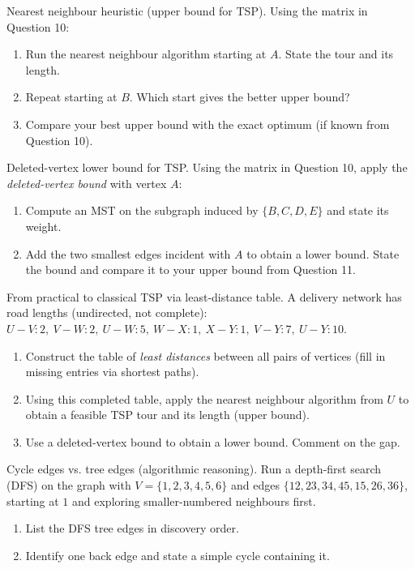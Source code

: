 \documentclass[11pt]{article}
\def\textbf#1{#1}%
\newcounter{question}
\begin{document}
\begin{question}
\textbf{Nearest neighbour heuristic (upper bound for TSP).}
Using the matrix in Question 10:
\begin{enumerate}
  \item Run the nearest neighbour algorithm starting at $A$. State the tour and its length.
  \item Repeat starting at $B$. Which start gives the better upper bound?
  \item Compare your best upper bound with the exact optimum (if known from Question 10).
\end{enumerate}
\end{question}

\begin{question}
\textbf{Deleted-vertex lower bound for TSP.}
Using the matrix in Question 10, apply the \emph{deleted-vertex bound} with vertex $A$:
\begin{enumerate}
  \item Compute an MST on the subgraph induced by $\{B,C,D,E\}$ and state its weight.
  \item Add the two smallest edges incident with $A$ to obtain a lower bound. State the bound and compare it to your upper bound from Question 11.
\end{enumerate}
\end{question}

\begin{question}
\textbf{From practical to classical TSP via least-distance table.}
A delivery network has road lengths (undirected, not complete): 
$U\!-\!V:2,\ V\!-\!W:2,\ U\!-\!W:5,\ W\!-\!X:1,\ X\!-\!Y:1,\ V\!-\!Y:7,\ U\!-\!Y:10$.
\begin{enumerate}
  \item Construct the table of \emph{least distances} between all pairs of vertices (fill in missing entries via shortest paths).
  \item Using this completed table, apply the nearest neighbour algorithm from $U$ to obtain a feasible TSP tour and its length (upper bound).
  \item Use a deleted-vertex bound to obtain a lower bound. Comment on the gap.
\end{enumerate}
\end{question}

\begin{question}
\textbf{Cycle edges vs. tree edges (algorithmic reasoning).}
Run a depth-first search (DFS) on the graph with $V=\{1,2,3,4,5,6\}$ and edges
$\{12,23,34,45,15,26,36\}$, starting at $1$ and exploring smaller-numbered neighbours first.
\begin{enumerate}
  \item List the DFS tree edges in discovery order.
  \item Identify one back edge and state a simple cycle containing it.
\end{enumerate}
\end{question}
\end{document}

